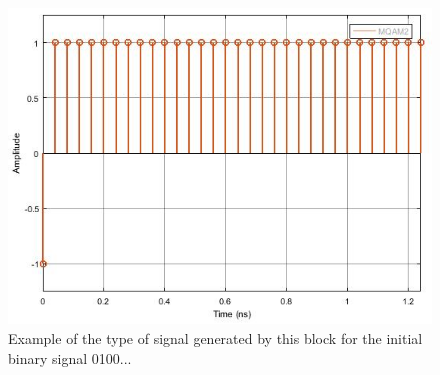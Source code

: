 \begin{figure}
	\centering
	\includegraphics[width=\textwidth]{../m_qam_transmitter/figures/IQmodulator_output}
	
	\caption{Example of the type of signal generated by this block for the initial binary signal 0100... }\label{DeterministicAppendZeros}

\end{figure}

